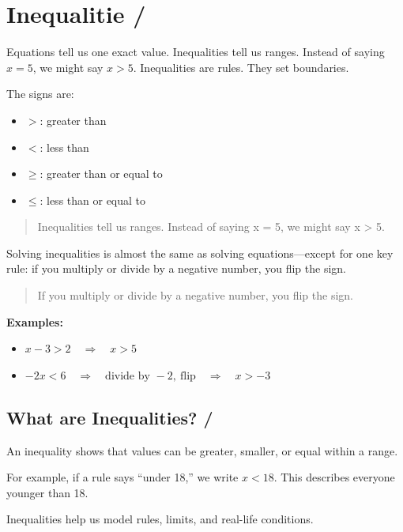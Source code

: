 \newpage
\section{Inequalitie / }
Equations tell us one exact value. Inequalities tell us ranges. Instead of saying \(x = 5\), we might say \(x > 5\). Inequalities are rules. They set boundaries.  

The signs are:
\begin{itemize}
  \item \(>\): greater than
  \item \(<\): less than
  \item \(\geq\): greater than or equal to
  \item \(\leq\): less than or equal to
\end{itemize}



\blockquote{Inequalities tell us ranges. Instead of saying x = 5, we might say x > 5.}


Solving inequalities is almost the same as solving equations—except for one key rule: if you multiply or divide by a negative number, you flip the sign.  

\blockquote{If you multiply or divide by a negative number, you flip the sign.}

\textbf{Examples:}
\begin{itemize}
  \item \(x - 3 > 2 \quad \Rightarrow \quad x > 5\)
  \item \(-2x < 6 \quad \Rightarrow \quad \text{divide by } -2,\ \text{flip} \quad \Rightarrow \quad x > -3\)
\end{itemize}

\subsection{What are Inequalities? / }
An inequality shows that values can be greater, smaller, or equal within a range.  

For example, if a rule says “under 18,” we write \(x < 18\). This describes everyone younger than 18.  

Inequalities help us model rules, limits, and real-life conditions.  


